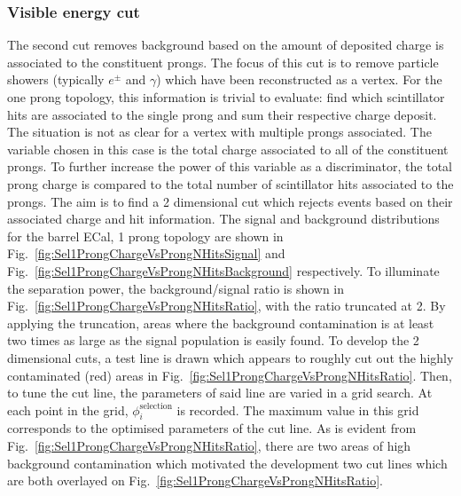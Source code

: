 \subsubsection{Visible energy cut}
\label{subsubsec:VisibleEnergyCut}
The second cut removes background based on the amount of deposited charge is associated to the constituent prongs. The focus of this cut is to remove particle showers (typically $e^\pm$ and $\gamma$) which have been reconstructed as a vertex.  For the one prong topology, this information is trivial to evaluate: find which scintillator hits are associated to the single prong and sum their respective charge deposit.  The situation is not as clear for a vertex with multiple prongs associated.  The variable chosen in this case is the total charge associated to all of the constituent prongs.  To further increase the power of this variable as a discriminator, the total prong charge is compared to the total number of scintillator hits associated to the prongs.  The aim is to find a 2 dimensional cut which rejects events based on their associated charge and hit information.
\newline
\newline
The signal and background distributions for the barrel ECal, 1 prong topology are shown in Fig.~\ref{fig:Sel1ProngChargeVsProngNHitsSignal} and Fig.~\ref{fig:Sel1ProngChargeVsProngNHitsBackground} respectively.  To illuminate the separation power, the background/signal ratio is shown in Fig.~\ref{fig:Sel1ProngChargeVsProngNHitsRatio}, with the ratio truncated at 2.  By applying the truncation, areas where the background contamination is at least two times as large as the signal population is easily found.  To develop the 2 dimensional cuts, a test line is drawn which appears to roughly cut out the highly contaminated (red) areas in Fig.~\ref{fig:Sel1ProngChargeVsProngNHitsRatio}.  Then, to tune the cut line, the parameters of said line are varied in a grid search.  At each point in the grid, $\phi_i^{\textrm{selection}}$ is recorded.  The maximum value in this grid corresponds to the optimised parameters of the cut line.  As is evident from Fig.~\ref{fig:Sel1ProngChargeVsProngNHitsRatio}, there are two areas of high background contamination which motivated the development two cut lines which are both overlayed on Fig.~\ref{fig:Sel1ProngChargeVsProngNHitsRatio}.
